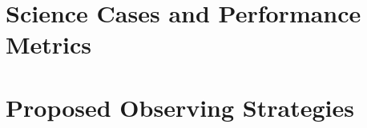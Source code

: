 \documentclass[11pt,headsepline,cleardoubleempty,twoside,openright]{scrbook}
\begin{document}

%  

% 


\part{Science Cases and Performance Metrics}
\def\partname{science}\label{part:\partname}















\part{Proposed Observing Strategies}
\def\partname{proposals}\label{part:\partname}

% 
% 
% 
% 
\end{document}
